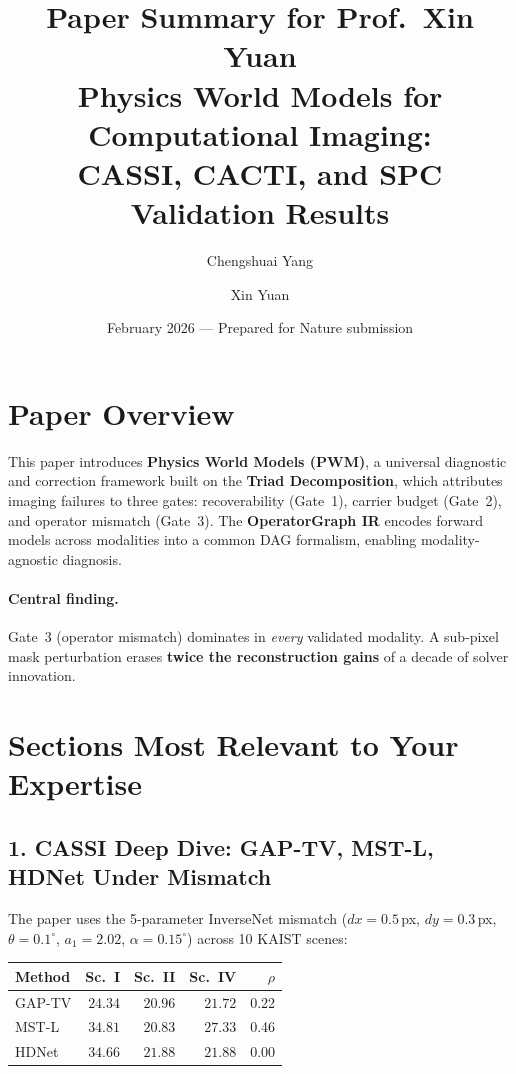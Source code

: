 \documentclass[11pt]{article}
\title{\textbf{Paper Summary for Prof.\ Xin Yuan}\\[4pt]
\large Physics World Models for Computational Imaging:\\
CASSI, CACTI, and SPC Validation Results}
\author{Chengshuai Yang \and Xin Yuan}
\date{February 2026 --- Prepared for Nature submission}
\begin{document}
\maketitle
\thispagestyle{empty}

\section*{Paper Overview}

This paper introduces \textbf{Physics World Models (PWM)}, a universal diagnostic and correction framework built on the \textbf{Triad Decomposition}, which attributes imaging failures to three gates: recoverability (Gate~1), carrier budget (Gate~2), and operator mismatch (Gate~3).  The \textbf{OperatorGraph IR} encodes forward models across modalities into a common DAG formalism, enabling modality-agnostic diagnosis.

\paragraph{Central finding.}  Gate~3 (operator mismatch) dominates in \emph{every} validated modality.  A sub-pixel mask perturbation erases \textbf{twice the reconstruction gains} of a decade of solver innovation.

\section*{Sections Most Relevant to Your Expertise}

\subsection*{1. CASSI Deep Dive: GAP-TV, MST-L, HDNet Under Mismatch}

The paper uses the 5-parameter InverseNet mismatch ($dx{=}0.5$\,px, $dy{=}0.3$\,px, $\theta{=}0.1^\circ$, $a_1{=}2.02$, $\alpha{=}0.15^\circ$) across 10 KAIST scenes:

\begin{center}
\begin{tabular}{lrrrr}
\toprule
\textbf{Method} & \textbf{Sc.~I} & \textbf{Sc.~II} & \textbf{Sc.~IV} & \textbf{$\rho$} \\
\midrule
GAP-TV  & $24.34$ & $20.96$ & $21.72$ & 0.22 \\
MST-L   & $34.81$ & $20.83$ & $27.33$ & 0.46 \\
HDNet   & $34.66$ & $21.88$ & $21.88$ & 0.00 \\
\bottomrule
\end{tabular}
\end{center}
\end{document}
